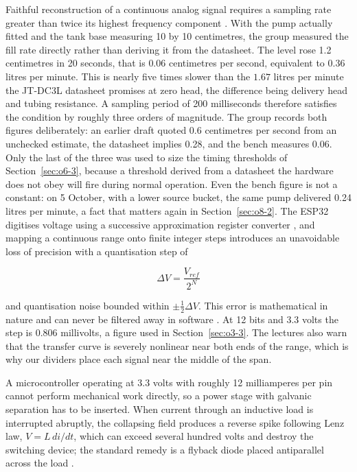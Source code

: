 Faithful reconstruction of a continuous analog signal requires a sampling rate greater than twice its highest frequency component \cite{shannon1949}. With the pump actually fitted and the tank base measuring 10 by 10 centimetres, the group measured the fill rate directly rather than deriving it from the datasheet. The level rose 1.2 centimetres in 20 seconds, that is $0.06$ centimetres per second, equivalent to $0.36$ litres per minute. This is nearly five times slower than the $1.67$ litres per minute the JT-DC3L datasheet promises at zero head, the difference being delivery head and tubing resistance. A sampling period of 200 milliseconds therefore satisfies the condition by roughly three orders of magnitude. The group records both figures deliberately: an earlier draft quoted 0.6 centimetres per second from an unchecked estimate, the datasheet implies 0.28, and the bench measures 0.06. Only the last of the three was used to size the timing thresholds of Section~\ref{sec:o6-3}, because a threshold derived from a datasheet the hardware does not obey will fire during normal operation. Even the bench figure is not a constant: on 5 October, with a lower source bucket, the same pump delivered 0.24 litres per minute, a fact that matters again in Section~\ref{sec:o8-2}. The ESP32 digitises voltage using a successive approximation register converter \cite{slide01, esp32ds}, and mapping a continuous range onto finite integer steps introduces an unavoidable loss of precision with a quantisation step of

\begin{equation}
\Delta V = \frac{V_{ref}}{2^N}
\label{eq:lsb}
\end{equation}

and quantisation noise bounded within $\pm \frac{1}{2}\Delta V$. This error is mathematical in nature and can never be filtered away in software \cite{slide01}. At 12 bits and 3.3 volts the step is 0.806 millivolts, a figure used in Section~\ref{sec:o3-3}. The lectures also warn that the transfer curve is severely nonlinear near both ends of the range, which is why our dividers place each signal near the middle of the span.

A microcontroller operating at 3.3 volts with roughly 12 milliamperes per pin cannot perform mechanical work directly, so a power stage with galvanic separation has to be inserted. When current through an inductive load is interrupted abruptly, the collapsing field produces a reverse spike following Lenz law, $V = L\,di/dt$, which can exceed several hundred volts and destroy the switching device; the standard remedy is a flyback diode placed antiparallel across the load \cite{slide01}.

